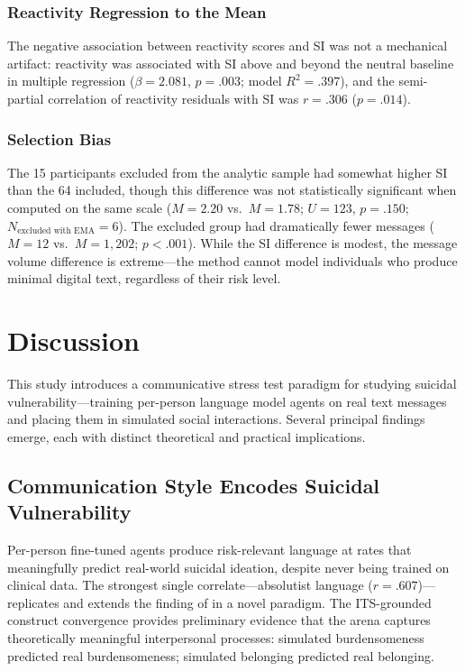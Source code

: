 \documentclass[review,12pt,authoryear]{elsarticle}
\begin{document}
\subsubsection{Reactivity Regression to the Mean}

The negative association between reactivity scores and SI was not a mechanical artifact: reactivity was associated with SI above and beyond the neutral baseline in multiple regression ($\beta = 2.081$, $p = .003$; model $R^2 = .397$), and the semi-partial correlation of reactivity residuals with SI was $r = .306$ ($p = .014$).

\subsubsection{Selection Bias}

The 15 participants excluded from the analytic sample had somewhat higher SI than the 64 included, though this difference was not statistically significant when computed on the same scale ($M = 2.20$ vs.\ $M = 1.78$; $U = 123$, $p = .150$; $N_{\text{excluded with EMA}} = 6$). The excluded group had dramatically fewer messages ($M = 12$ vs.\ $M = 1{,}202$; $p < .001$). While the SI difference is modest, the message volume difference is extreme---the method cannot model individuals who produce minimal digital text, regardless of their risk level.


\section{Discussion}

This study introduces a communicative stress test paradigm for studying suicidal vulnerability---training per-person language model agents on real text messages and placing them in simulated social interactions. Several principal findings emerge, each with distinct theoretical and practical implications.

\subsection{Communication Style Encodes Suicidal Vulnerability}

Per-person fine-tuned agents produce risk-relevant language at rates that meaningfully predict real-world suicidal ideation, despite never being trained on clinical data. The strongest single correlate---absolutist language ($r = .607$)---replicates and extends the finding of \citet{almosaiwi2018absolute} in a novel paradigm. The ITS-grounded construct convergence provides preliminary evidence that the arena captures theoretically meaningful interpersonal processes: simulated burdensomeness predicted real burdensomeness; simulated belonging predicted real belonging.
\end{document}
